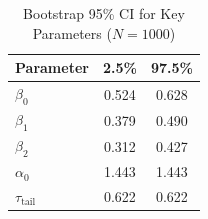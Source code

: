 \begin{table}[htbp]
\caption{Bootstrap 95\% CI for Key Parameters ($N=1000$)}
\label{tab:sensitivity_samples}
\centering
\begin{tabular}{lcc}
\toprule
\textbf{Parameter} & \textbf{2.5\%} & \textbf{97.5\%} \\
\midrule
$\beta_0$ & 0.524 & 0.628 \\
$\beta_1$ & 0.379 & 0.490 \\
$\beta_2$ & 0.312 & 0.427 \\
$\alpha_0$ & 1.443 & 1.443 \\
$\tau_{\mathrm{tail}}$ & 0.622 & 0.622 \\
\bottomrule
\end{tabular}
\end{table}